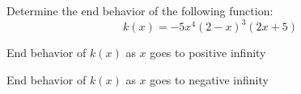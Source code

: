 \documentclass{ximera}
\author{David Kish}
\begin{document}
\begin{exercise}
Determine the end behavior of the following function:
\[
k(x)=-5x^4(2-x)^3(2x+5)
\]
\begin{exercise}
End behavior of $k(x)$ as $x$ goes to positive infinity
\begin{multipleChoice}
\end{multipleChoice}
\end{exercise}
\begin{exercise}
End behavior of $k(x)$ as $x$ goes to negative infinity
\begin{multipleChoice}
\end{multipleChoice}
\end{exercise}

\end{exercise}
\end{document}
